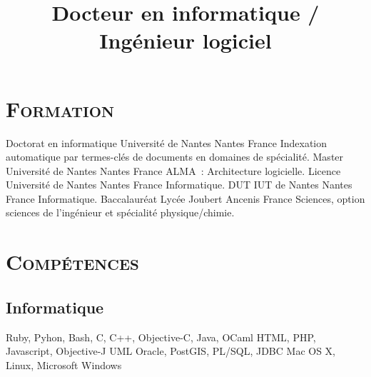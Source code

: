 \documentclass[10pt, a4paper]{moderncv}
\title{\large{Docteur en informatique / Ingénieur logiciel}}
\begin{document}
  \maketitle

  \section{\textsc{Formation}}
            {Doctorat en informatique}  %
            {Université de Nantes}      %
            {Nantes}                    %
            {France}                    %
            {Indexation automatique par termes-clés de documents en domaines de
            spécialité.}                %
            {Master}
            {Université de Nantes}
            {Nantes}
            {France}
            {ALMA~: Architecture logicielle.}
            {Licence}
            {Université de Nantes}
            {Nantes}
            {France}
            {Informatique.}
            {DUT}
            {IUT de Nantes}
            {Nantes}
            {France}
            {Informatique.}
            {Baccalauréat}
            {Lycée Joubert}
            {Ancenis}
            {France}
            {Sciences, option sciences de l'ingénieur et spécialité
             physique/chimie.}

  \section{\textsc{Compétences}}
    \subsection{Informatique}
             {Ruby, Pyhon, Bash, C, C++, Objective-C, Java, OCaml}
             {HTML, PHP, Javascript, Objective-J}
             {UML}
             {Oracle, PostGIS, PL/SQL, JDBC}
             {Mac OS X, Linux, Microsoft Windows}
\end{document}
